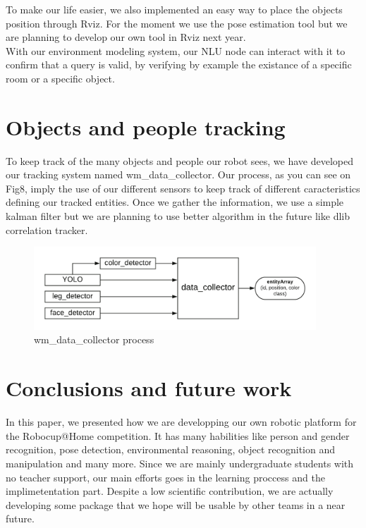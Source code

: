 \documentclass[runningheads,a4paper]{llncs}
\begin{document}
To make our life easier, we also implemented an easy way to place the objects position through Rviz. For the moment we use the pose estimation tool but we are planning to develop our own tool in Rviz next year.\\

With our environment modeling system, our NLU node can interact with it to confirm that a query is valid, by verifying by example the existance of a specific room or a specific object. \\

\section{Objects and people tracking}

\tab To keep track of the many objects and people our robot sees, we have developed our tracking system named wm\_data\_collector\cite{wm_data_collector}. Our process, as you can see on Fig8, imply the use of our different sensors to keep track of different caracteristics defining our tracked entities. Once we gather the information, we use a simple kalman filter but we are planning to use better algorithm in the future like dlib correlation tracker. \\

\begin{figure}
  \centering
  \includegraphics[width=300pt]{images/wm_data_collector.png}
  \caption{ wm\_data\_collector process}
\end{figure} 


\section{Conclusions and future work} 
\tab In this paper, we presented how we are developping our own robotic platform for the Robocup@Home competition. It has many habilities like person and gender recognition, pose detection, environmental reasoning, object recognition and manipulation and many more. Since we are mainly undergraduate students with no teacher support, our main efforts goes in the learning proccess and the implimetentation part. Despite a low scientific contribution, we are actually developing some package that we hope will be usable by other teams in a near future.\\
\end{document}
